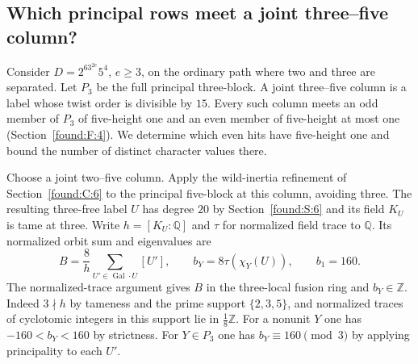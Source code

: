 \documentclass[11pt,a4paper]{article}
\numberwithin{equation}{section}
\theoremstyle{remark}
\begin{document}
\subsection{Which principal rows meet a joint three--five column?}\label{found:P:4}
Consider $D=2^63^{2e}5^4$, $e\ge3$, on the ordinary path where two and
three are separated. Let $P_3$ be the full principal three-block.
A joint three--five column is a label whose twist order is divisible by
$15$. Every such column meets an odd member of
$P_3$ of five-height one and an even member of five-height at most one (Section~\ref{found:F:4}). We determine which even hits have five-height one and bound the number of distinct character values there.

Choose a joint two--five column. Apply the wild-inertia refinement
of Section~\ref{found:C:6} to the principal five-block at this column, avoiding
three. The resulting three-free label $U$ has degree $20$ by
Section~\ref{found:S:6} and its field $K_U$ is tame at three. Write
$h=[K_U:\mathbb Q]$ and $\tau$ for normalized field trace to
$\mathbb Q$. Its normalized orbit sum and eigenvalues are
\[
       B=\frac8h\sum_{U'\in\operatorname{Gal}\cdot U}[U'],
       \qquad b_Y=8\tau(\chi_Y(U)),\qquad b_1=160.
\]
The normalized-trace argument gives $B$ in the three-local fusion
ring and $b_Y\in\mathbb Z$. Indeed $3\nmid h$ by tameness and the
prime support $\{2,3,5\}$, and normalized traces of cyclotomic integers
in this support lie in $\tfrac18\mathbb Z$. For a nonunit $Y$ one has
$-160<b_Y<160$ by strictness. For $Y\in P_3$ one has
$b_Y\equiv160\pmod3$ by applying principality to each $U'$.
\end{document}
